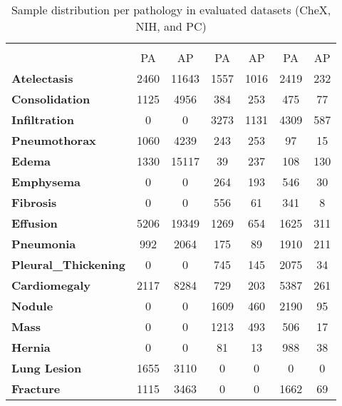\begin{table}[H]
\centering
\caption[Sample Distribution Per Pathology in Evaluated Datasets (CheX, NIH, and PC)]{Sample distribution per pathology in evaluated datasets (CheX, NIH, and PC)}%
\label{tab:taxonomy.table.2.datasets.ninstances}
\begin{tabular}{lcccccc}
\rowcolor[HTML]{79A8A4}
\multicolumn{1}{c}{\cellcolor[HTML]{79A8A4}{\color[HTML]{FFFFFF} }} & \multicolumn{2}{c}{\cellcolor[HTML]{79A8A4}{\color[HTML]{FFFFFF} \textbf{CheXpert}}} & \multicolumn{2}{c}{\cellcolor[HTML]{79A8A4}{\color[HTML]{FFFFFF} \textbf{NIH}}} & \multicolumn{2}{c}{\cellcolor[HTML]{79A8A4}{\color[HTML]{FFFFFF} \textbf{PADCHEST}}} \\
\rowcolor[HTML]{79A8A4}
\multicolumn{1}{c}{\multirow{-2}{*}{\cellcolor[HTML]{79A8A4}{\color[HTML]{FFFFFF} \textbf{Pathologies\textbackslash{}Dataset}}}} & {\color[HTML]{FFFFFF} PA} & {\color[HTML]{FFFFFF} AP} & {\color[HTML]{FFFFFF} PA} & {\color[HTML]{FFFFFF} AP} & {\color[HTML]{FFFFFF} PA} & {\color[HTML]{FFFFFF} AP} \\
\textbf{Atelectasis} & 2460 & 11643 & 1557 & 1016 & 2419 & 232 \\
\textbf{Consolidation} & 1125 & 4956 & 384 & 253 & 475 & 77 \\
\textbf{Infiltration} & 0 & 0 & 3273 & 1131 & 4309 & 587 \\
\textbf{Pneumothorax} & 1060 & 4239 & 243 & 253 & 97 & 15 \\
\textbf{Edema} & 1330 & 15117 & 39 & 237 & 108 & 130 \\
\textbf{Emphysema} & 0 & 0 & 264 & 193 & 546 & 30 \\
\textbf{Fibrosis} & 0 & 0 & 556 & 61 & 341 & 8 \\
\textbf{Effusion} & 5206 & 19349 & 1269 & 654 & 1625 & 311 \\
\textbf{Pneumonia} & 992 & 2064 & 175 & 89 & 1910 & 211 \\
\textbf{Pleural\_Thickening} & 0 & 0 & 745 & 145 & 2075 & 34 \\
\textbf{Cardiomegaly} & 2117 & 8284 & 729 & 203 & 5387 & 261 \\
\textbf{Nodule} & 0 & 0 & 1609 & 460 & 2190 & 95 \\
\textbf{Mass} & 0 & 0 & 1213 & 493 & 506 & 17 \\
\textbf{Hernia} & 0 & 0 & 81 & 13 & 988 & 38 \\
\textbf{Lung Lesion} & 1655 & 3110 & 0 & 0 & 0 & 0 \\
\textbf{Fracture} & 1115 & 3463 & 0 & 0 & 1662 & 69 \\

\end{tabular}
\end{table}
